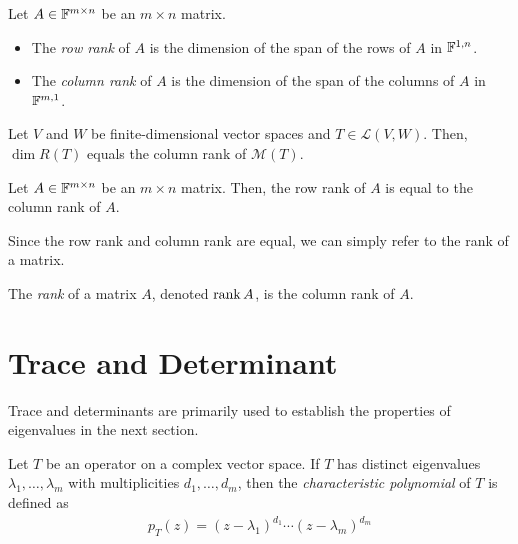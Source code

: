 \documentclass{article}
\begin{document}
\begin{definition}
  Let $A \in \mathbb{F}^{m \times n}$ be an $m \times n$ matrix.
  \begin{itemize}
    \item The \emph{row rank} of $A$ is the dimension of the span of the rows of $A$ in $\mathbb{F}^{1, n}$.
    \item The \emph{column rank} of $A$ is the dimension of the span of the columns of $A$ in $\mathbb{F}^{m, 1}$.
  \end{itemize}
\end{definition}

\begin{theorem}
  Let $V$ and $W$ be finite-dimensional vector spaces and $T \in \mathcal{L}(V, W)$.
  Then, $\dim R(T)$ equals the column rank of $\mathcal{M}(T)$.
\end{theorem}

\begin{theorem}
  Let $A \in \mathbb{F}^{m \times n}$ be an $m \times n$ matrix.
  Then, the row rank of $A$ is equal to the column rank of $A$.
\end{theorem}

Since the row rank and column rank are equal, we can simply refer to the rank of a matrix.

\begin{definition}[Rank]
  The \emph{rank} of a matrix $A$, denoted $\rank A$, is the column rank of $A$.
\end{definition}

\section{Trace and Determinant}

Trace and determinants are primarily used to establish the properties of eigenvalues in the next section.

\begin{definition}
  Let $T$ be an operator on a complex vector space.
  If $T$ has distinct eigenvalues $\lambda_1, \ldots, \lambda_m$ with multiplicities $d_1, \ldots, d_m$, then the \emph{characteristic polynomial} of $T$ is defined as
  \begin{align}
    p_T(z) = (z - \lambda_1)^{d_1} \cdots (z - \lambda_m)^{d_m}
  \end{align}
\end{definition}
\end{document}
